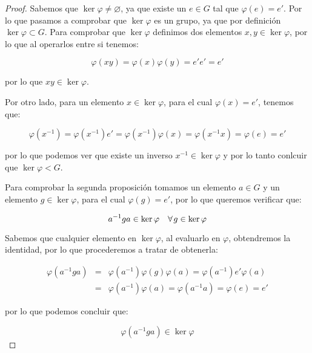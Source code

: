         \begin{proof}
            Sabemos que $\ker{\varphi} \ne \varnothing$, ya que existe un $e \in G$ tal que $\varphi(e) = e'$.
            Por lo que pasamos a comprobar que $\ker{\varphi}$ es un grupo, ya que por definición $\ker{\varphi} \subset G$.
            Para comprobar que $\ker{\varphi}$ definimos dos elementos $x, y \in \ker{\varphi}$, por lo que al operarlos entre si tenemos:

            \begin{equation*}
                \varphi(x y) = \varphi(x) \varphi(y) = e' e' = e'
            \end{equation*}

            por lo que $xy \in \ker{\varphi}$.

            Por otro lado, para un elemento $x \in \ker{\varphi}$, para el cual $\varphi(x) = e'$, tenemos que:

            \begin{equation*}
                \varphi(x^{-1}) = \varphi(x^{-1}) e' = \varphi(x^{-1}) \varphi(x) = \varphi(x^{-1} x) = \varphi(e) = e'
            \end{equation*}

            por lo que podemos ver que existe un inverso $x^{-1} \in \ker{\varphi}$ y por lo tanto conlcuir que $\ker{\varphi} < G$.

            Para comprobar la segunda proposición tomamos un elemento $a \in G$ y un elemento $g \in \ker{\varphi}$, para el cual $\varphi(g) = e'$, por lo que queremos verificar que:

            \begin{equation*}
                a^{-1} g a \in \ker{\varphi} \quad \forall \mkern2mu g \in \ker{\varphi}
            \end{equation*}

            Sabemos que cualquier elemento en $\ker{\varphi}$, al evaluarlo en $\varphi$, obtendremos la identidad, por lo que procederemos a tratar de obtenerla:

            \begin{eqnarray*}
                \varphi(a^{-1} g a) & = & \varphi(a^{-1}) \varphi(g) \varphi(a) = \varphi(a^{-1}) e' \varphi(a) \\
                & = & \varphi(a^{-1}) \varphi(a) = \varphi(a^{-1} a) = \varphi(e) = e'
            \end{eqnarray*}

            por lo que podemos concluir que:

            \begin{equation*}
                \varphi(a^{-1} g a) \in \ker{\varphi}
            \end{equation*}
        \end{proof}

